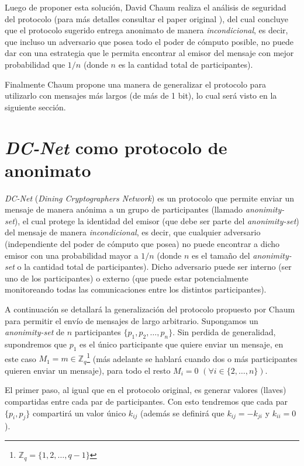 
Luego de proponer esta solución, David Chaum realiza el análisis de seguridad del protocolo (para más detalles consultar el paper original \cite{chaum1988dining}), del cual concluye que el protocolo sugerido entrega anonimato de manera \emph{incondicional}, es decir, que incluso un adversario que posea todo el poder de cómputo posible, no puede dar con una estrategia que le permita encontrar al emisor del mensaje con mejor probabilidad que $1/n$ (donde $n$ es la cantidad total de participantes).

Finalmente Chaum propone una manera de generalizar el protocolo para utilizarlo con mensajes más largos (de más de 1 bit), lo cual será visto en la siguiente sección.

\section{\emph{DC-Net} como protocolo de anonimato}

\emph{DC-Net} (\emph{Dining Cryptographers Network}) es un protocolo que permite enviar un mensaje de manera anónima a un grupo de participantes (llamado \emph{anonimity-set}), el cual protege la identidad del emisor (que debe ser parte del \emph{anonimity-set}) del mensaje de manera \emph{incondicional}, es decir, que cualquier adversario (independiente del poder de cómputo que posea) no puede encontrar a dicho emisor con una probabilidad mayor a $1/n$ (donde $n$ es el tamaño del \emph{anonimity-set} o la cantidad total de participantes). Dicho adversario puede ser interno (ser uno de los participantes) o externo (que puede estar potencialmente monitoreando todas las comunicaciones entre los distintos participantes).

A continuación se detallará la generalización del protocolo propuesto por Chaum para permitir el envío de mensajes de largo arbitrario. Supongamos un \emph{anonimity-set} de $n$ participantes $\{p_1, p_2, \ldots, p_n\}$. Sin perdida de generalidad, supondremos que $p_1$ es el único participante que quiere enviar un mensaje, en este caso $M_1 = m \in \mathbb{Z}_q$\footnote{$\mathbb{Z}_q = \{1, 2, \ldots, q - 1\}$} (más adelante se hablará cuando dos o más participantes quieren enviar un mensaje), para todo el resto $M_i = 0$ $(\forall i \in \{2, \ldots, n\})$.

El primer paso, al igual que en el protocolo original, es generar valores (llaves) compartidas entre cada par de participantes. Con esto tendremos que cada par $\{p_i, p_j\}$ compartirá un valor único $k_{ij}$ (además se definirá que $k_{ij} = -k_{ji}$ y $k_{ii} = 0$).

